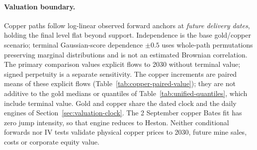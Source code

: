 \paragraph{Valuation boundary.}
Copper paths follow log-linear observed forward anchors at \emph{future
delivery dates}, holding the final level flat beyond support. Independence
is the base gold/copper scenario; terminal Gaussian-score dependence
$\pm0.5$ uses whole-path permutations preserving marginal distributions and
is not an estimated Brownian correlation. The primary comparison values
explicit flows to 2030 without terminal value; signed perpetuity is a separate
sensitivity. The copper increments are paired means of these explicit flows
(Table~\ref{tab:copper-paired-value});
they are not additive to the gold medians or quantiles of
Table~\ref{tab:unified-quantiles}, which include terminal value. Gold and
copper share the dated clock and the daily engines of
Section~\ref{sec:valuation-clock}. The
2 September copper Bates fit has zero jump intensity, so that engine reduces to
Heston. Neither conditional forwards nor IV tests validate physical copper
prices to 2030, future mine sales, costs or corporate equity value.


